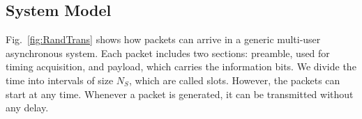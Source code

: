 \documentclass[journal,onecolumn,12pt]{IEEEtran}
\begin{document}

\subsection{System Model}
\label{sec:SM}
 Fig.~\ref{fig:RandTrans} shows how packets can arrive in a generic multi-user asynchronous system. Each packet includes two sections: preamble, used for timing acquisition, and payload, which carries the information bits.
 We divide the time into intervals of size $N_S$, which are called slots. However, the packets can start at any time. Whenever a packet is generated, it can be transmitted without any delay.
\end{document}
